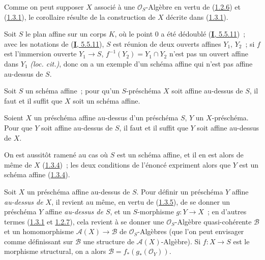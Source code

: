 Comme on peut supposer $X$ associé à une $\mathcal{O}_S$-Algèbre en vertu de
(\hyperref[II.1.2.6-fr]{1.2.6}) et (\hyperref[II.1.3.1-fr]{1.3.1}), le
corollaire résulte de la construction de $X$ décrite dans
(\hyperref[II.1.3.1-fr]{1.3.1}).

\begin{example}[1.3.3]
\label{II.1.3.3-fr}
Soit $S$ le plan affine sur un corps $K$, où le point $0$ a été dédoublé
(\hyperref[I.5.5.11-fr]{\textbf{I}, 5.5.11})~; avec les notations de
(\hyperref[I.5.5.11-fr]{\textbf{I}, 5.5.11}), $S$ est réunion de deux ouverts affines
$Y_1$, $Y_2$~; si $f$ est l'immersion ouverte $Y_1\to S$,
$f^{-1}(Y_2)=Y_1\cap Y_2$ n'est pas un ouvert affine dans $Y_1$
\emph{(loc. cit.)}, donc on a un exemple d'un schéma affine qui n'est pas
affine au-dessus de $S$.
\end{example}

\begin{corollary}[1.3.4]
\label{II.1.3.4-fr}
Soit $S$ un schéma affine~; pour qu'un $S$-préschéma $X$ soit affine au-dessus
de $S$, il faut et il suffit que $X$ soit un schéma affine.
\end{corollary}

\begin{corollary}[1.3.5]
\label{II.1.3.5-fr}
Soient $X$ un préschéma affine au-dessus d'un préschéma $S$, $Y$ un
$X$-préschéma. Pour que $Y$ soit affine au-dessus de $S$, il faut et il
suffit que $Y$ soit affine au-dessus de $X$.
\end{corollary}

On est aussitôt ramené au cas où $S$ est un schéma affine, et il en est alors
de même de $X$ (\hyperref[II.1.3.4-fr]{1.3.4})~; les deux conditions de
l'énoncé expriment alors que $Y$ est un schéma affine
(\hyperref[II.1.3.4-fr]{1.3.4}).

\begin{env}[1.3.6]
\label{II.1.3.6-fr}
Soit $X$ un préschéma affine au-dessus de $S$. Pour définir un préschéma $Y$
affine \emph{au-dessus de $X$}, il revient au même, en vertu de
(\hyperref[II.1.3.5-fr]{1.3.5}), de se donner un préschéma $Y$ affine
\emph{au-dessus de $S$}, et un $S$-morphisme $g:Y\to X$~; en d'autres termes
(\hyperref[II.1.3.1-fr]{1.3.1} et
\hyperref[II.1.2.7-fr]{1.2.7}), cela revient à se donner une
$\mathcal{O}_S$-Algèbre quasi-cohérente $\mathcal{B}$ et un homomorphisme
$\mathcal{A}(X)\to\mathcal{B}$ de $\mathcal{O}_S$-Algèbres (que l'on peut
envisager comme définissant sur $\mathcal{B}$ une structure de
$\mathcal{A}(X)$-Algèbre). Si $f:X\to S$ est le morphisme structural, on a
alors $\mathcal{B}=f_*(g_*(\mathcal{O}_Y))$.
\end{env}

